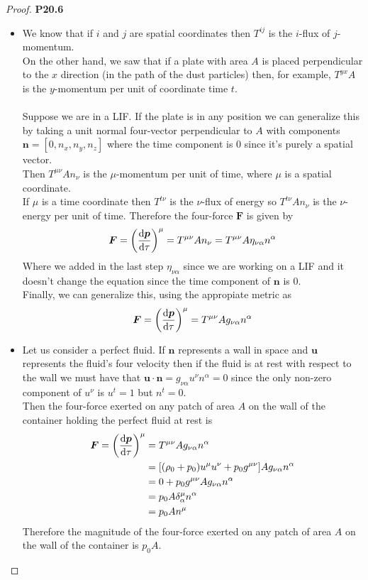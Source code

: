 \documentclass[11pt]{article}
\theoremstyle{definition}
\begin{document}
\cleardoublepage
\begin{proof}{\textbf{P20.6}}
\begin{itemize}
\item [\textbf{a.}] We know that if $i$ and $j$ are spatial coordinates
then $T^{ij}$ is the $i$-flux of $j$-momentum.\\
On the other hand, we saw that if a plate with area $A$ is placed perpendicular
to the $x$ direction (in the path of the dust particles) then, for example,
$T^{yx}A$ is the $y$-momentum per unit of coordinate time $t$.\\\\
Suppose we are in a LIF.
If the plate is in any position we can generalize this by taking a unit normal
four-vector perpendicular to $A$ with components $\bm{n} = [0, n_x, n_y, n_z]$
where the time component is 0 since it's purely a spatial vector.\\
Then $T^{\mu\nu} A n_\nu$ is the $\mu$-momentum per unit of time, where $\mu$
is a spatial coordinate.\\
If $\mu$ is a time coordinate then $T^{t\nu}$ is the $\nu$-flux of energy so
$T^{t\nu} A n_\nu$ is the $\nu$-energy per unit of time.
Therefore the four-force $\bm{F}$ is given by
\begin{align*}
    \bm{F} = \bigg(\dv{\bm{p}}{\tau}\bigg)^\mu = T^{\mu\nu} A n_\nu
    = T^{\mu\nu} A \eta_{\nu\alpha} n^\alpha
\end{align*}
Where we added in the last step $\eta_{\nu\alpha}$ since we are working on a
LIF and it doesn't change the equation since the time component of $\bm{n}$ is
0.\\
Finally, we can generalize this, using the appropiate metric as 
\begin{align*}
    \bm{F} = \bigg(\dv{\bm{p}}{\tau}\bigg)^\mu
    = T^{\mu\nu} A g_{\nu\alpha} n^\alpha
\end{align*}

\item [\textbf{b.}] Let us consider a perfect fluid. If $\bm{n}$ represents
a wall in space and $\bm{u}$ represents the fluid's four velocity then if
the fluid is at rest with respect to the wall we must have that
$\bm{u} \cdot \bm{n} = g_{\nu\alpha}u^{\nu} n^\alpha = 0$ since the only
non-zero component of $u^\nu$ is $u^t = 1$ but $n^t = 0$.\\
Then the four-force exerted on any patch of area $A$ on the wall of the
container holding the perfect fluid at rest is
\begin{align*}
    \bm{F} = \bigg(\dv{\bm{p}}{\tau}\bigg)^\mu
    &= T^{\mu\nu} A g_{\nu\alpha} n^\alpha\\
    &= [(\rho_0 + p_0)u^\mu u^\nu + p_0 g^{\mu\nu}]A g_{\nu\alpha} n^\alpha\\   
    &= 0 + p_0 g^{\mu\nu}A g_{\nu\alpha} n^\alpha\\
    &= p_0 A \delta^{\mu}_{\alpha} n^\alpha\\
    &= p_0 A n^\mu
\end{align*}
Therefore the magnitude of the four-force exerted on any patch of area $A$
on the wall of the container is $p_0 A$.
\end{itemize}
\end{proof}
\end{document}
